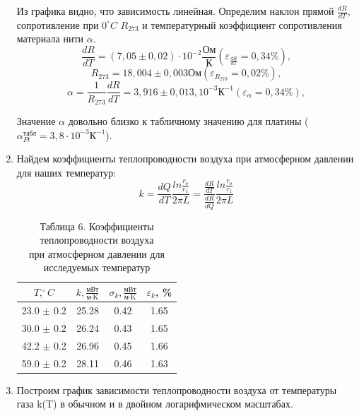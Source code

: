 \documentclass[a4paper]{article}
\begin{document}
\begin{enumerate}
Из графика видно, что зависимость линейная. Определим наклон прямой $\frac{dR}{dT}$, сопротивление при $0 ^\circ C$ $R_{273}$ и температурный коэффициент сопротивления материала нити $\alpha$.
\begin{equation*}
	\frac{dR}{dT} = (7,05 \pm 0,02) \cdot 10^{-2} \frac{\text{Ом}}{\text{К}} (\varepsilon_{\frac{dR}{dT}} = 0,34\%),
\end{equation*}
\begin{equation*}
	R_{273} = 18,004 \pm 0,003 \text{Ом} (\varepsilon_{R_{273}} = 0,02\%),
\end{equation*}
\begin{equation*}
	\alpha = \frac{1}{R_{273}}\frac{dR}{dT} = 3,916 \pm 0,013, 10^{-3} \text{К}^{-1} (\varepsilon_{\alpha} = 0,34\%),
\end{equation*}

Значение $\alpha$ довольно близко к табличному значению для платины ($\alpha_{Pt} ^{\text{табл}} = 3,8 \cdot 10^{-3} \text{К}^{-1} $).

\item Найдем коэффициенты теплопроводности воздуха при атмосферном давлении для наших температур:
\begin{equation*}
	k = \frac{dQ}{dT} \frac{ln\frac{r_o}{r_1}}{2\pi L} = \frac{\frac{dR}{dT}}{\frac{dR}{dQ}} \frac{ln\frac{r_o}{r_1}}{2\pi L}
\end{equation*}

\begin{table}[h!]
    \centering
    \begin{tabular}{|*{4}{c|}}
	\hline
        $T, ^\circ C$ & $k, \frac{\text{мВт}}{\text{м} \cdot \text{K}}$ & $\sigma_k,  \frac{\text{мВт}}{\text{м} \cdot \text{K}}$& $\varepsilon_k$, \% \\ \hline
        23.0 $\pm$ 0.2  & 25.28 & 0.42 & 1.65 \\ \hline
        30.0 $\pm$ 0.2  & 26.24 & 0.43 & 1.65 \\ \hline
        42.2 $\pm$ 0.2& 26.96 & 0.45 & 1.66 \\ \hline
        59.0  $\pm$ 0.2 & 28.11 & 0.46 & 1.63 \\ \hline
    \end{tabular}
    \caption{Таблица 6. Коэффициенты теплопроводности воздуха\\ при атмосферном давлении для исследуемых температур}
\end{table}

\item Построим график зависимости теплопроводности воздуха от температуры газа k(T) в обычном и в двойном логарифмическом масштабах.


\end{enumerate}
\end{document}
